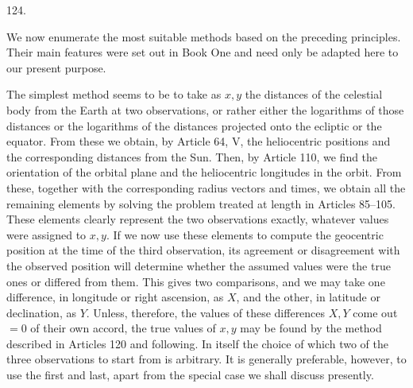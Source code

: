 \par{}\medskip
\begin{center}\hypertarget{native-171-article124}{}124.\end{center}
We now enumerate the most suitable methods based on the preceding principles. Their main features were set out in Book One and need only be adapted here to our present purpose.

The simplest method seems to be to take as $x,y$ the distances of the celestial body from the Earth at two observations, or rather either the logarithms of those distances or the logarithms of the distances projected onto the ecliptic or the equator. From these we obtain, by Article 64, V, the heliocentric positions and the corresponding distances from the Sun. Then, by Article 110, we find the orientation of the orbital plane and the heliocentric longitudes in the orbit. From these, together with the corresponding radius vectors and times, we obtain all the remaining elements by solving the problem treated at length in Articles 85–105. These elements clearly represent the two observations exactly, whatever values were assigned to $x,y$. If we now use these elements to compute the geocentric position at the time of the third observation, its agreement or disagreement with the observed position will determine whether the assumed values were the true ones or differed from them. This gives two comparisons, and we may take one difference, in longitude or right ascension, as $X$, and the other, in latitude or declination, as $Y$. Unless, therefore, the values of these differences $X,Y$ come out $=0$ of their own accord, the true values of $x,y$ may be found by the method described in Articles 120 and following. In itself the choice of which two of the three observations to start from is arbitrary. It is generally preferable, however, to use the first and last, apart from the special case we shall discuss presently.

